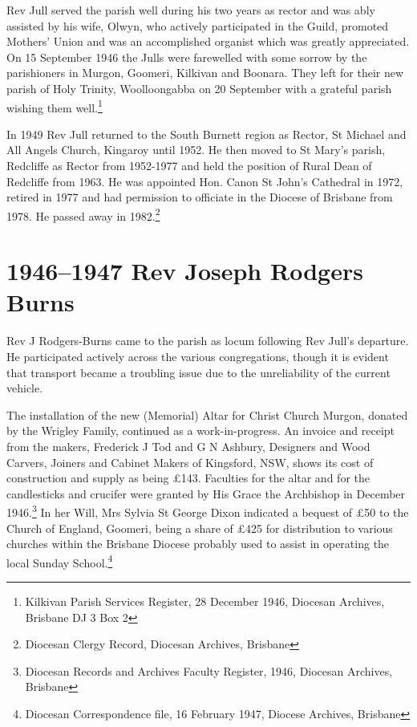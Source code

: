 Rev Jull served the parish well during his two years as rector and was ably assisted by his wife, Olwyn, who actively participated in the Guild, promoted Mothers' Union and was an accomplished organist which was greatly appreciated. On 15 September 1946 the Julls were farewelled with some sorrow by the parishioners in Murgon, Goomeri, Kilkivan and Boonara. They left for their new parish of Holy Trinity, Woolloongabba on 20 September with a grateful parish wishing them well.\footnote{Kilkivan Parish Services Register, 28 December 1946, Diocesan Archives, Brisbane DJ 3 Box 2}


In 1949 Rev Jull returned to the South Burnett region as Rector, St Michael and All Angels Church, Kingaroy until 1952. He then moved to St Mary's parish, Redcliffe as Rector from 1952-1977 and held the position of Rural Dean of Redcliffe from 1963. He was appointed Hon. Canon St John's Cathedral in 1972, retired in 1977 and had permission to officiate in the Diocese of Brisbane from 1978. He passed away in 1982.\footnote{Diocesan Clergy Record, Diocesan Archives, Brisbane}


\section{1946--1947 Rev Joseph Rodgers Burns}



Rev J Rodgers-Burns came to the parish as locum following Rev Jull's departure. He participated actively across the various congregations, though it is evident that transport became a troubling issue due to the unreliability of the current vehicle.



The installation of the new (Memorial) Altar for Christ Church Murgon, donated by the Wrigley Family, continued as a work-in-progress. An invoice and receipt from the makers, Frederick J Tod and G N Ashbury, Designers and Wood Carvers, Joiners and Cabinet Makers of Kingsford, NSW, shows its cost of construction and supply as being \pounds143. Faculties for the altar and for the candlesticks and crucifer were granted by His Grace the Archbishop in December 1946.\footnote{Diocesan Records and Archives Faculty Register, 1946, Diocesan Archives, Brisbane} In her Will, Mrs Sylvia St George Dixon indicated a bequest of \pounds50 to the Church of England, Goomeri, being a share of \pounds425 for distribution to various churches within the Brisbane Diocese probably used to assist in operating the local Sunday School.\footnote{Diocesan Correspondence file, 16 February 1947, Diocese Archives, Brisbane}









